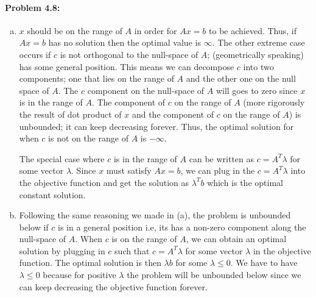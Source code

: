 \documentclass[12pt] {article}
\begin{document}
\paragraph{Problem 4.8:} 
\begin{enumerate}[(a)]
\item $x$ should be on the range of $A$ in order for $Ax=b$ to be achieved. Thus, if $Ax=b$ has no solution then the optimal value is $\infty$. The other extreme case occurs if $c$ is not orthogonal to the null-space of $A$; (geometrically speaking) has some general position. This means we can decompose $c$ into two components; one that lies on the range of $A$ and the other one on the null space of $A$. The $c$ component on the null-space of $A$ will goes to zero since $x$ is in the range of $A$. The component of $c$ on the range of $A$ (more rigorously the result of dot product of $x$ and the component of $c$ on the range of $A$) is unbounded; it can keep decreasing forever. Thus, the optimal solution for when $c$ is not on the range of $A$ is $-\infty$. 

The special case where $c$ is in the range of $A$ can be written as $c = A^{T}\lambda$ for some vector $\lambda$. Since $x$ must satisfy $Ax=b$, we can plug in the $c = A^{T}\lambda$ into the objective function and get the solution as $\lambda^{T}b$ which is the optimal constant solution. 

\item Following the same reasoning we made in (a), the problem is unbounded below if $c$ is in a general position i.e, its has a non-zero component along the null-space of $A$. When $c$ is on the range of $A$, we can obtain an optimal solution by plugging in $c$ such that $c = A^{T}\lambda$ for some vector $\lambda$ in the objective function. The optimal solution is then $\lambda b$ for some $\lambda \leq 0$. We have to have $\lambda \leq 0$ because for positive $\lambda$ the problem will be unbounded below since we can keep decreasing the objective function forever. 


\end{enumerate}
\end{document}
